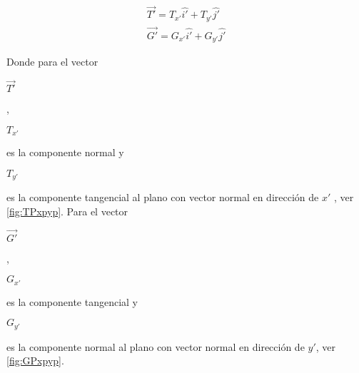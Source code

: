 \documentclass[12pt,letterpaper, twoside, openany]{article}
\begin{document}
%
\begin{large}
	\begin{align}
		\overset{\rightarrow}{T'}= T_{x'} \hat{i'} + T_{y' }\hat{j'} \label{eq:TPcomp}\\
		\overset{\rightarrow}{G'}= G_{x'} \hat{i'} + G_{y' }\hat{j'} \label{eq:GPcomp}			
	\end{align}
\end{large}
%
Donde para el vector  \begin{large} $\overset{\rightarrow}{T'}$\end{large}, \begin{large} $T_{x'}$\end{large} es la componente normal y \begin{large} $T_{y'}$\end{large} es la componente tangencial al plano con vector normal en dirección de ${x'}$ , ver \cref{fig:TPxpyp}. Para el vector \begin{large} $\overset{\rightarrow}{G'}$\end{large}, \begin{large} $G_{x'}$\end{large} es la componente tangencial y \begin{large} $G_{y'}$\end{large} es la componente normal al plano con vector normal en dirección de ${y'}$, ver \cref{fig:GPxpyp}.
\end{document}

